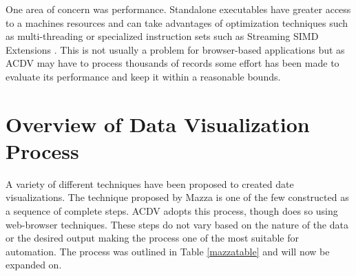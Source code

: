 \documentclass[a4paper, 11pt, titlepage, onehalfspacing]{report}
\begin{document}
One area of concern was performance. Standalone executables have greater access to a machines resources and can take advantages of optimization techniques such as multi-threading or specialized instruction sets such as Streaming SIMD Extensions \cite{sse}. This is not usually a problem for browser-based applications but as AC\lightning{}DV may have to process thousands of records some effort has been made to evaluate its performance and keep it within a reasonable bounds.


\section{Overview of Data Visualization Process}
A variety of different techniques have been proposed to created date visualizations. The technique proposed by Mazza \cite{mazza2009introduction} is one of the few constructed as a sequence of complete steps. AC\lightning{}DV adopts this process, though does so using web-browser techniques. These steps do not vary based on the nature of the data or the desired output making the process one of the most suitable for automation. The process was outlined in Table \ref{mazzatable} and will now be expanded on.
\end{document}
